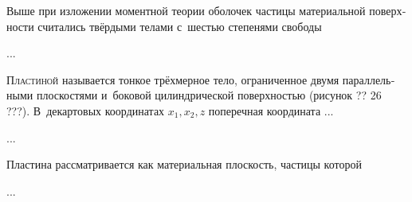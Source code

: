 \begin{otherlanguage}{russian}


\noindent Выше при изложении моментной теории оболочек частицы материальной поверхности считались твёрдыми телами с~шестью степенями свободы

...



\end{otherlanguage}



\label{para:overviewofplates}

\begin{otherlanguage}{russian}

\lettrine[lines=2, findent=2pt, nindent=0pt]{П}{ластиной} называется тонкое трёхмерное тело, ограниченное двумя параллельными плоскостями и~боковой цилиндрической поверхностью (рисунок ?? 26 ???). В~декартовых координатах ${x_1, x_2, z}$ поперечная координата ...

...



\end{otherlanguage}



\begin{otherlanguage}{russian}

Пластина рассматривается как материальная плоскость, частицы которой

...



\end{otherlanguage}

